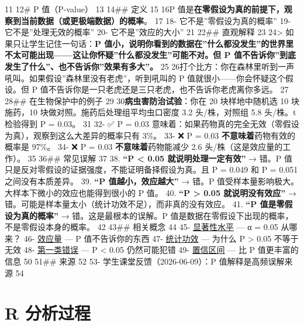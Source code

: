 \documentclass[
  letterpaper,
]{scrbook}
\begin{document}
11\textbar{} 12\textbar\# P 值（P-value） 13\textbar{} 14\textbar\#\#
定义 15\textbar{} 16\textbar P
值是\textbf{在零假设为真的前提下，观察到当前数据（或更极端数据）的概率}。
17\textbar{} 18\textbar- 它不是''零假设为真的概率'' 19\textbar-
它不是''处理无效的概率'' 20\textbar- 它不是''效应的大小'' 21\textbar{}
22\textbar\#\# 直观解释 23\textbar{} 24\textbar\textgreater{}
如果只让学生记住一句话：\textbf{P
值小，说明你看到的数据在''什么都没发生''的世界里不太可能出现------这让你怀疑''什么都没发生''可能不对。但
P 值不告诉你''到底发生了什么''、也不告诉你''效果有多大''。} 25\textbar{}
26\textbar 打个比方：你在森林里听到一声吼叫。如果假设''森林里没有老虎''，听到吼叫的
P 值就很小------你会怀疑这个假设。但 P
值不告诉你是一只老虎还是三只老虎，也不告诉你老虎离你多远。 27\textbar{}
28\textbar\#\# 在生物保护中的例子 29\textbar{}
30\textbar{}\textbf{病虫害防治试验}：你在 20 块样地中随机选 10
块施药，10 块做对照。施药后处理组平均虫口密度 3.2 头/株，对照组 5.8
头/株。t 检验得到 P = 0.03。 31\textbar{} 32\textbar- ✅ P = 0.03
意味着：如果药物真的完全无效（零假设为真），观察到这么大差异的概率只有
3\%。 33\textbar- ❌ P = 0.03 \textbf{不意味着}药物有效的概率是 97\%。
34\textbar- ❌ P = 0.03 \textbf{不意味着}药物能减少 2.6
头/株（这是效应量的工作）。 35\textbar{} 36\textbar\#\# 常见误解
37\textbar{} 38. \textbf{``P \textless{} 0.05
就说明处理一定有效''} → 错。P
值只是反对零假设的证据强度，不能证明备择假设为真。且 P = 0.049 和 P =
0.051 之间没有本质差异。 39. \textbf{``P 值越小，效应越大''} →
错。P 值受样本量影响极大。大样本下微小的效应也能得到很小的 P 值。
40. \textbf{``P \textgreater{} 0.05 就说明没有效应''} →
错。可能是样本量太小（统计功效不足），而非真的没有效应。 41.
\textbf{``P 值是零假设为真的概率''} → 错。这是最根本的误解。P
值是数据在零假设下出现的概率，不是零假设本身的概率。 42\textbar{}
43\textbar\#\# 相关概念 44\textbar{} 45\textbar-
\href{significance-level.md}{显著性水平} --- α = 0.05 从哪来？
46\textbar- \href{effect-size.md}{效应量} --- P 值不告诉你的东西
47\textbar- \href{statistical-power.md}{统计功效} --- 为什么 P
\textgreater{} 0.05 不等于无效 48\textbar-
\href{../concepts/type-i-error.md}{第一类错误} --- P \textless{} 0.05
仍然可能犯错 49\textbar-
\href{../concepts/confidence-interval.md}{置信区间} --- 比 P
值更丰富的信息 50\textbar{} 51\textbar\#\# 来源 52\textbar{} 53\textbar-
学生课堂反馈（2026-06-09）：P 值解释是高频误解来源 54\textbar{}

\section{R 分析过程}\label{r-ux5206ux6790ux8fc7ux7a0b-3}
\end{document}

